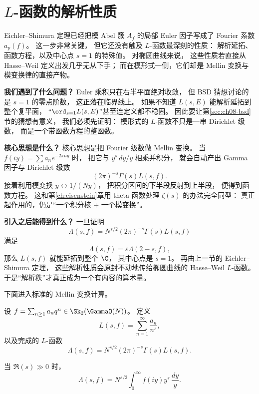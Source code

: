 \section{$L$-函数的解析性质}
\label{sec:ch08-l-functions}

Eichler--Shimura 定理已经把模 Abel 簇 $A_f$ 的局部 Euler 因子写成了 Fourier 系数 $a_p(f)$。
这一步非常关键，
但它还没有触及 $L$-函数最深刻的性质：
解析延拓、函数方程，以及中心点 $s=1$ 的特殊值。
对椭圆曲线来说，
这些性质若直接从 Hasse--Weil 定义出发几乎无从下手；
而在模形式一侧，它们却是 Mellin 变换与模变换律的直接产物。

\textbf{我们遇到了什么问题？}
Euler 乘积只在右半平面绝对收敛，
但 BSD 猜想讨论的是 $s=1$ 的零点阶数，
这正落在临界线上。
如果不知道 $L(s,E)$ 能解析延拓到整个复平面，
“$\ord_{s=1}L(s,E)$”甚至连定义都不稳固。
因此要让第\ref{sec:ch08-bsd}节的猜想有意义，
我们必须先证明：
模形式的 $L$-函数不只是一串 Dirichlet 级数，
而是一个带函数方程的整函数。

\textbf{核心思想是什么？}
核心思想是把 Fourier 级数做 Mellin 变换。
当 $f(iy)=\sum a_ne^{-2\pi ny}$ 时，
把它与 $y^s\,dy/y$ 相乘并积分，
就会自动产出 Gamma 因子与 Dirichlet 级数
\[
  (2\pi)^{-s}\Gamma(s)L(s,f).
\]
接着利用模变换 $y\leftrightarrow 1/(Ny)$，
把积分区间的下半段反射到上半段，
便得到函数方程。
这和第\ref{ch:eisenstein}章用 theta 函数处理 $\zeta(s)$ 的办法完全同型：
真正起作用的，仍是“一个积分核 + 一个模变换”。

\textbf{引入之后能得到什么？}
一旦证明
\[
  \Lambda(s,f)=N^{s/2}(2\pi)^{-s}\Gamma(s)L(s,f)
\]
满足
\[
  \Lambda(s,f)=\varepsilon\Lambda(2-s,f),
\]
那么 $L(s,f)$ 就能延拓到整个 $\C$，
其中心点是 $s=1$。
再由上一节的 Eichler--Shimura 定理，
这些解析性质会原封不动地传给椭圆曲线的 Hasse--Weil $L$-函数。
于是“解析秩”才真正成为一个有内容的算术量。



下面进入标准的 Mellin 变换计算。

\begin{definition}[完成的 $L$-函数]
\label{def:ch08-completed-l}
设 $f=\sum_{n\ge1}a_nq^n\in \Sk_2(\GammaO(N))$。
定义
\[
  L(s,f)=\sum_{n=1}^{\infty}\frac{a_n}{n^s},
\]
以及完成的 $L$-函数
\[
  \Lambda(s,f)=N^{s/2}(2\pi)^{-s}\Gamma(s)L(s,f).
\]
\end{definition}

\begin{proposition}
\label{prop:ch08-mellin}
当 $\Re(s)\gg0$ 时，
\[
  \Lambda(s,f)=N^{s/2}\int_0^{\infty} f(iy)y^s\,\frac{dy}{y}.
\]
\end{proposition}

